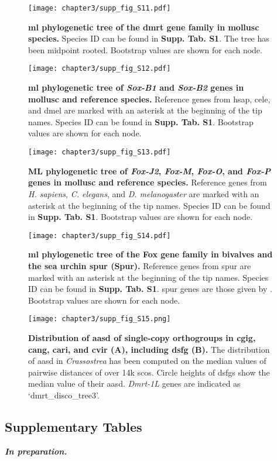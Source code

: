 \documentclass[../main.tex]{subfiles}
\begin{document}
\begin{figure}[ht]
	\centering
	\texttt{[image: chapter3/supp\_fig\_S11.pdf]}
	\captionsetup{width=\textwidth}
	\caption{
		\textbf{\gls{ml} phylogenetic tree of the \gls{dmrt} gene family in mollusc species.} Species ID can be found in \textbf{Supp. Tab. S1}. The tree has been midpoint rooted. Bootstrap values are shown for each node.
	}
	\label{suppFig:dmrt_molluscOnly}
\end{figure}

\begin{figure}[ht]
	\centering
	\texttt{[image: chapter3/supp\_fig\_S12.pdf]}
	\captionsetup{width=\textwidth}
	\caption{
		\textbf{\gls{ml} phylogenetic tree of \textit{Sox-B1} and \textit{Sox-B2} genes in mollusc and reference species.} Reference genes from \gls{hsap}, \gls{cele}, and \gls{dmel} are marked with an asterisk at the beginning of the tip names. Species ID can be found in \textbf{Supp. Tab. S1}. Bootstrap values are shown for each node.
	}
	\label{suppFig:sox_B12}
\end{figure}

\begin{figure}[ht]
	\centering
	\texttt{[image: chapter3/supp\_fig\_S13.pdf]}
	\captionsetup{width=\textwidth}
	\caption{
		\textbf{ML phylogenetic tree of \textit{Fox-J2}, \textit{Fox-M}, \textit{Fox-O}, and \textit{Fox-P} genes in mollusc and reference species.} Reference genes from \textit{H. sapiens}, \textit{C. elegans}, and \textit{D. melanogaster} are marked with an asterisk at the beginning of the tip names. Species ID can be found in \textbf{Supp. Tab. S1}. Bootstrap values are shown for each node.
	}
	\label{suppFig:fox_JMOP}
\end{figure}

\begin{figure}[ht]
	\centering
	\texttt{[image: chapter3/supp\_fig\_S14.pdf]}
	\captionsetup{width=\textwidth}
	\caption{
		\textbf{\gls{ml} phylogenetic tree of the Fox gene family in bivalves and the sea urchin \gls{spur} (Spur).} Reference genes from \gls{spur} are marked with an asterisk at the beginning of the tip names. Species ID can be found in \textbf{Supp. Tab. S1}. \gls{spur} genes are those given by \textbf{\cite{tu2006sea}}. Bootstrap values are shown for each node.
	}
	\label{suppFig:fox_JMOP}
\end{figure}

\begin{figure}[ht]
	\centering
	\texttt{[image: chapter3/supp\_fig\_S15.png]}
	\captionsetup{width=\textwidth}
	\caption{
		\textbf{Distribution of \gls{aasd} of single-copy orthogroups in \gls{cgig}, \gls{cang}, \gls{cari}, and \gls{cvir} (A), including \gls{dsfg} (B).} The distribution of \gls{aasd} in \textit{Crassostrea} has been computed on the median values of pairwise distances of over 14k \glspl{sco}. Circle heights of \glspl{dsfg} show the median value of their \gls{aasd}. \textit{Dmrt-1L} genes are indicated as ‘dmrt\_disco\_tree3’.
	}
	\label{suppFig:DSFG_crassostreaDivergence}
\end{figure}

\clearpage

\subsection{Supplementary Tables}

\textbf{\textit{In preparation.}}
\end{document}
